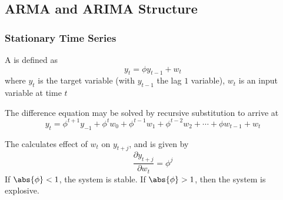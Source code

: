 \subsection{ARMA and ARIMA Structure}

\subsubsection{Stationary Time Series}

\begin{definition}
A  is defined as
\begin{equation*}
y_t = \phi y_{t-1} + w_t \nonumber
\end{equation*}
where $y_t$ is the target variable (with $y_{t-1}$ the lag $1$ variable), $w_t$ is an input variable at time $t$
\end{definition}

The difference equation may be solved by recursive substitution to arrive at
\begin{equation*}
y_t = \phi^{t+1}y_{-1} + \phi^{t} w_0 + \phi^{t-1} w_1 + \phi^{t-2} w_2 + \cdots + \phi w_{t-1} + w_t \nonumber
\end{equation*}

The  calculates effect of $w_t$ on $y_{t+j}$, and is given by
\begin{equation*}
\frac{\partial y_{t+j}}{\partial w_t} = \phi^j \nonumber
\end{equation*}
If $\abs{\phi} < 1$, the system is stable. If $\abs{\phi} > 1$, then the system is explosive.

